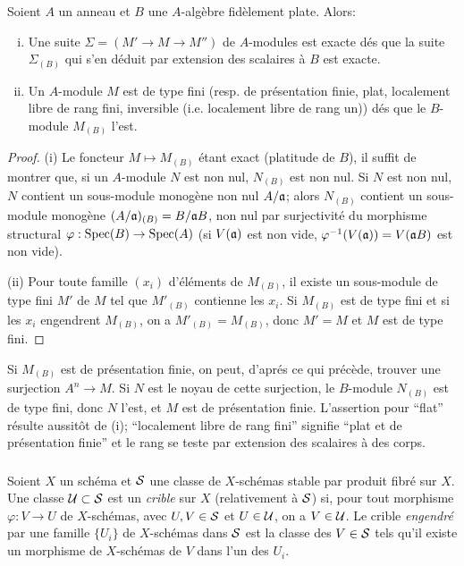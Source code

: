 \documentclass[oneside]{book}
\begin{document}
\begin{proposition}\label{I:1-4-2}
Soient $A$ un anneau et $B$ une $A$-algèbre fidèlement plate. Alors:
\begin{enumerate}[(i)]
  \item Une suite $\Sigma=(M'\to M\to M'')$ de $A$-modules est exacte dés 
    que la suite $\Sigma_{(B)}$ qui s'en déduit par extension des scalaires 
    à $B$ est exacte.
  \item Un $A$-module $M$ est de type fini (resp. de présentation finie, 
    plat, localement libre de rang fini, inversible (i.e. localement libre 
    de rang un)) dés que le $B$-module $M_{(B)}$ l'est.
\end{enumerate}
\end{proposition}
\begin{proof}
(i) Le foncteur $M\mapsto M_{(B)}$ étant exact (platitude de $B$), il suffit 
de montrer que, si un $A$-module $N$ est non nul, $N_{(B)}$ est non nul. Si 
$N$ est non nul, $N$ contient un sous-module monogène non nul $A/\mathfrak{a}$; alors 
$N_{(B)}$ contient un sous-module monogène $(A/\mathfrak{a})_{(B)} = B/\mathfrak{a} B$, non nul 
par surjectivité du morphisme structural $\varphi:\operatorname{Spec}(B)\to\operatorname{Spec}(A)$ (si 
$V(\mathfrak{a})$ est non vide, $\varphi^{-1}(V(\mathfrak{a}))=V(\mathfrak{a} B)$ est non vide). 

(ii) Pour toute famille $(x_i)$ d'éléments de $M_{(B)}$, il existe un 
sous-module de type fini $M'$ de $M$ tel que $M'_{(B)}$ contienne les $x_i$. Si 
$M_{(B)}$ est de type fini et si les $x_i$ engendrent $M_{(B)}$, on a 
$M'_{(B)}=M_{(B)}$, donc $M'=M$ et $M$ est de type fini. 
\end{proof}

Si $M_{(B)}$ est de présentation finie, on peut, d'aprés ce qui précède, 
trouver une surjection $A^n\to M$. Si $N$ est le noyau de cette surjection, le 
$B$-module $N_{(B)}$ est de type fini, donc $N$ l'est, et $M$ est de 
présentation finie. L'assertion pour ``flat'' résulte aussitôt de (i); 
``localement libre de rang fini'' signifie ``plat et de présentation finie'' 
et le rang se teste par extension des scalaires à des corps.





\subsubsection{}\label{I:1-4-3}

Soient $X$ un schéma et $\mathcal{S}$ une classe de $X$-schémas stable par produit 
fibré sur $X$. Une classe $\mathcal{U}\subset \mathcal{S}$ est un \emph{crible} sur $X$ 
(relativement à $\mathcal{S}$) si, pour tout morphisme $\varphi:V\to U$ de 
$X$-schémas, avec $U,V\in \mathcal{S}$ et $U\in\mathcal{U}$, on a $V\in \mathcal{U}$. Le crible 
\emph{engendré} par une famille $\{U_i\}$ de $X$-schémas dans $\mathcal{S}$ est la 
classe des $V\in\mathcal{S}$ tels qu'il existe un morphisme de $X$-schémas de $V$ dans 
l'un des $U_i$. 
\end{document}
